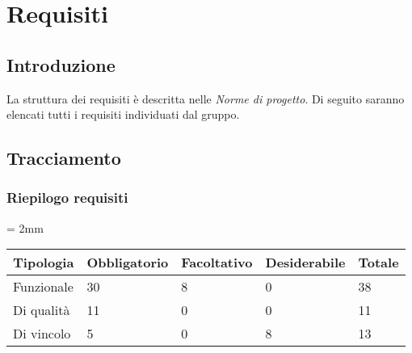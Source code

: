 \section{Requisiti}

    \subsection{Introduzione}
    La struttura dei requisiti è descritta nelle \emph{Norme di progetto}. Di seguito saranno elencati tutti i requisiti individuati dal gruppo. 
    
    
    
    
    
    
    \subsection{Tracciamento}
    
    
    \subsubsection{Riepilogo requisiti}
    
    \tabulinesep = 2mm %
    \begin{longtabu} to \textwidth {| X | X | X | X | X |} %
    \hline
        
    \textbf{Tipologia} & \textbf{Obbligatorio} & \textbf{Facoltativo} & \textbf{Desiderabile} & \textbf{Totale} \\
    \hline
    Funzionale & 30 & 8 & 0 & 38\\
    \hline
    Di qualità & 11 & 0 & 0 & 11\\
    \hline
    Di vincolo & 5 & 0 & 8 & 13\\
    \hline
    
    \end{longtabu}






